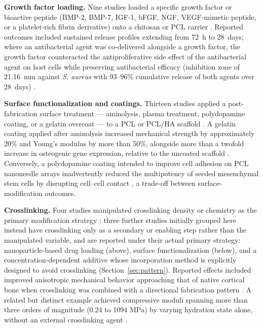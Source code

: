 \documentclass[5p,times,twocolumn]{elsarticle}
\begin{document}
\textbf{Growth factor loading.} Nine studies loaded a specific growth factor or bioactive peptide (BMP-2, BMP-7, IGF-1, bFGF, NGF, VEGF-mimetic peptide, or a platelet-rich fibrin derivative) onto a chitosan or PCL carrier \cite{ref7,ref8,ref10,ref25,ref42,ref72,ref75,ref76,ref77}. Reported outcomes included sustained release profiles extending from 72~h to 28~days; where an antibacterial agent was co-delivered alongside a growth factor, the growth factor counteracted the antiproliferative side effect of the antibacterial agent on host cells while preserving antibacterial efficacy (inhibition zone of 21.16~mm against \textit{S. aureus} with 93--96\% cumulative release of both agents over 28~days) \cite{ref25}.

\textbf{Surface functionalization and coatings.} Thirteen studies applied a post-fabrication surface treatment --- aminolysis, plasma treatment, polydopamine coating, or a gelatin overcoat --- to a PCL or PCL/HA scaffold \cite{ref18,ref25,ref26,ref46,ref53,ref54,ref55,ref60,ref68,ref72,ref73,ref76,ref77}. A gelatin coating applied after aminolysis increased mechanical strength by approximately 20\% and Young's modulus by more than 50\%, alongside more than a twofold increase in osteogenic gene expression, relative to the uncoated scaffold \cite{ref18}. Conversely, a polydopamine coating intended to improve cell adhesion on PCL nanoneedle arrays inadvertently reduced the multipotency of seeded mesenchymal stem cells by disrupting cell--cell contact \cite{ref60}, a trade-off between surface-modification outcomes.

\textbf{Crosslinking.} Four studies manipulated crosslinking density or chemistry as the primary modification strategy \cite{ref1,ref5,ref16,ref54}; three further studies initially grouped here instead have crosslinking only as a secondary or enabling step rather than the manipulated variable, and are reported under their actual primary strategy: nanoparticle-based drug loading \cite{ref12} (above), surface functionalization \cite{ref18} (below), and a concentration-dependent additive whose incorporation method is explicitly designed to avoid crosslinking \cite{ref61} (Section~\ref{sec:pattern}). Reported effects included improved anisotropic mechanical behavior approaching that of native cortical bone when crosslinking was combined with a directional fabrication pattern \cite{ref1}. A related but distinct example achieved compressive moduli spanning more than three orders of magnitude (0.24 to 1094 MPa) by varying hydration state alone, without an external crosslinking agent \cite{ref51}.
\end{document}
